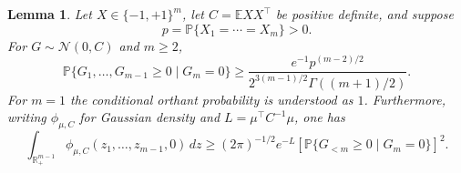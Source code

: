 \documentclass[11pt]{article}
\newtheorem{lemma}[theorem]{Lemma}
\theoremstyle{remark}\newtheorem{remark}[theorem]{Remark}
\newcommand{\E}{\mathbb E}
\newcommand{\Pp}{\mathbb P}
\newcommand{\R}{\mathbb R}
\newcommand{\cN}{\mathcal N}
\begin{document}
\begin{lemma}\label{lem:boundary}
Let $X\in\{-1,+1\}^m$, let $C=\E XX^\top$ be positive definite, and
suppose
\[
 p=\Pp\{X_1=\cdots=X_m\}>0.
\]
For $G\sim\cN(0,C)$ and $m\ge2$,
\begin{equation}\label{eq:conditional-orthant}
 \Pp\{G_1,\ldots,G_{m-1}\ge0\mid G_m=0\}
 \ge \frac{e^{-1}p^{(m-2)/2}}
 {2^{3(m-1)/2}\Gamma((m+1)/2)}.
\end{equation}
For $m=1$ the conditional orthant probability is understood as $1$.
Furthermore, writing $\phi_{\mu,C}$ for Gaussian density and
$L=\mu^\top C^{-1}\mu$, one has
\begin{equation}\label{eq:shifted-face}
 \int_{\R_+^{m-1}}\phi_{\mu,C}(z_1,\ldots,z_{m-1},0)\,dz
 \ge (2\pi)^{-1/2}e^{-L}
 \left[\Pp\{G_{<m}\ge0\mid G_m=0\}\right]^2.
\end{equation}
\end{lemma}
\end{document}
